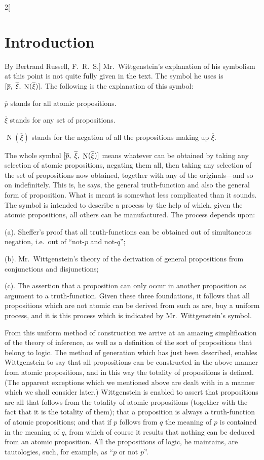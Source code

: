 \documentclass[oneside,openany,12pt]{book}
\newcommand{\nop}{\mathop{\mathrm{N}}}
\begin{document}
\begin{multicols}{2}[\section*{Introduction}By Bertrand Russell, F.\ R.\ S.]
Mr.\ Wittgenstein's explanation of his symbolism at this point is not quite fully given in the text. The symbol he uses is $[\overline{p},\thickspace \overline{\xi},\thickspace \nop(\overline{\xi})].$ The following is the explanation of this symbol:
%
\begin{description}[noitemsep,labelindent=1em,leftmargin=3em,rightmargin=1em]
  \item $\overline{p}$ stands for all atomic propositions.
  \item $\overline{\xi}$ stands for any set of propositions.
  \item $\nop(\overline{\xi})$ stands for the negation of all the propositions making up $\overline{\xi}$.
 \end{description}

The whole symbol $[\overline{p},\thickspace \overline{\xi},\thickspace \nop(\overline{\xi})]$ means whatever can be obtained by taking any selection of atomic propositions, negating them all, then taking any selection of the set of propositions now obtained, together with any of the originals---and so on indefinitely. This is, he says, the general truth-function and also the general form of proposition. What is meant is somewhat less complicated than it sounds. The symbol is intended to describe a process by the help of which, given the atomic propositions, all others can be manufactured. The process depends upon:

(a). Sheffer's proof that all truth-functions can be obtained out of simultaneous negation, i.e.\ out of ``not-$p$ and not-$q$'';

(b). Mr.\ Wittgenstein's theory of the derivation of general propositions from conjunctions and disjunctions;

(c). The assertion that a proposition can only occur in another proposition as argument to a truth-function. Given these three foundations, it follows that all propositions which are not atomic can be derived from such as are, buy a uniform process, and it is this process which is indicated by Mr.\ Wittgenstein's symbol.

From this uniform method of construction we arrive at an amazing simplification of the theory of inference, as well as a definition of the sort of propositions that belong to logic. The method of generation which has just been described, enables Wittgenstein to say that all propositions can be constructed in the above manner from atomic propositions, and in this way the totality of propositions is defined. (The apparent exceptions which we mentioned above are dealt with in a manner which we shall consider later.) Wittgenstein is enabled to assert that propositions are all that follows from the totality of atomic propositions (together with the fact that it is the totality of them); that a proposition is always a truth-function of atomic propositions; and that if $p$ follows from $q$ the meaning of $p$ is contained in the meaning of $q$, from which of course it results that nothing can be deduced from an atomic proposition. All the propositions of logic, he maintains, are tautologies, such, for example, as ``$p$ or not $p$''.


\end{multicols}
\end{document}
